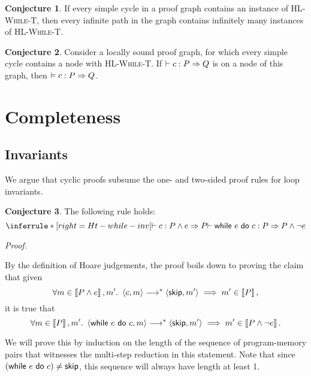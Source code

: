 \documentclass[10pt]{article}
\theoremstyle{definition}
\newtheorem{conjecture}{Conjecture}
\begin{document}
\begin{conjecture}
    If every simple cycle in a proof graph
    contains an instance of \textsc{HL-While-T},
    then every infinite path in the graph
    contains infinitely many instances of \textsc{HL-While-T}.
\end{conjecture}

\begin{conjecture}
    Consider a locally sound proof graph,
    for which every simple cycle contains a node
    with \textsc{HL-While-T}.
    If $\DER \Triple c : P => Q$ is on a node of this graph,
    then $\VAL \Triple c : P => Q$.
\end{conjecture}



\section{Completeness}

\subsection*{Invariants}

We argue that cyclic proofs subsume the one- and two-sided proof rules for loop invariants.


\begin{conjecture}
The following rule holds:
\begin{displaymath}
    \inferrule*[right=Ht-while-inv]
    { \DER \Triple c : P \wedge e => P }
    { \DER \Triple \While e do c : P => P \wedge \neg e }
\end{displaymath}
\end{conjecture}

\noindent
\emph{Proof.}

\noindent
By the definition of Hoare judgements, the proof boils down to proving 
the claim that given 
\[
    \forall m \in \Interp{P \wedge e}, m'.\
    \Cfg(c, m) \sstepstotrans \Cfg(\Skip, m') 
    \implies m' \in \Interp{P},
\]
it is true that 
\[
    \forall m \in \Interp{P}, m'.\
    \Cfg(\While e do c, m) \sstepstotrans \Cfg(\Skip, m')
    \implies m' \in \Interp{P \wedge \neg e}.
\]

We will prove this by induction on the length of the sequence of program-memory pairs that witnesses 
the multi-step reduction in this statement. Note that since $(\While e do c) \neq \Skip$, 
this sequence will always have length at least 1.
\end{document}
